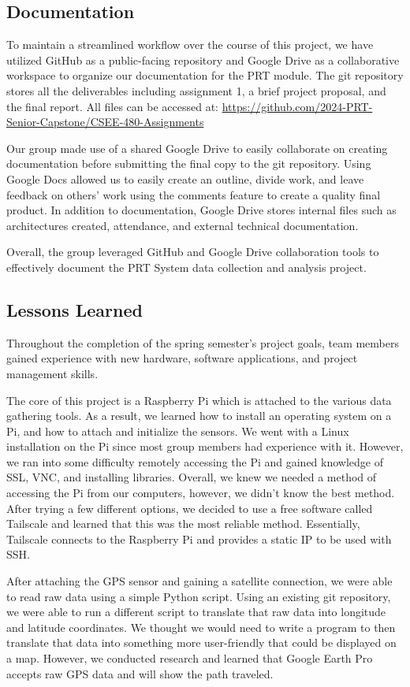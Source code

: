 \subsection{Documentation}
To maintain a streamlined workflow over the course of this project, we have utilized GitHub as a public-facing repository and Google Drive as a collaborative workspace to organize our documentation for the PRT module. 
The git repository stores all the deliverables including assignment 1, a brief project proposal, and the final report. 
All files can be accessed at: \url{https://github.com/2024-PRT-Senior-Capstone/CSEE-480-Assignments}

Our group made use of a shared Google Drive to easily collaborate on creating documentation before submitting the final copy to the git repository. 
Using Google Docs allowed us to easily create an outline, divide work, and leave feedback on others' work using the comments feature to create a quality final product. 
In addition to documentation, Google Drive stores internal files such as architectures created, attendance, and external technical documentation.

Overall, the group leveraged GitHub and Google Drive collaboration tools to effectively document the PRT System data collection and analysis project. 

\subsection{Lessons Learned}
Throughout the completion of the spring semester’s project goals, team members gained experience with new hardware, software applications, and project management skills. 

The core of this project is a Raspberry Pi which is attached to the various data gathering tools. 
As a result, we learned how to install an operating system on a Pi, and how to attach and initialize the sensors. 
We went with a Linux installation on the Pi since most group members had experience with it. 
However, we ran into some difficulty remotely accessing the Pi and gained knowledge of SSL, VNC, and installing libraries. 
Overall, we knew we needed a method of accessing the Pi from our computers, however, we didn’t know the best method. 
After trying a few different options, we decided to use a free software called Tailscale and learned that this was the most reliable method. 
Essentially, Tailscale connects to the Raspberry Pi and provides a static IP to be used with SSH. 

After attaching the GPS sensor and gaining a satellite connection, we were able to read raw data using a simple Python script. 
Using an existing git repository, we were able to run a different script to translate that raw data into longitude and latitude coordinates. 
We thought we would need to write a program to then translate that data into something more user-friendly that could be displayed on a map. 
However, we conducted research and learned that Google Earth Pro accepts raw GPS data and will show the path traveled. 

